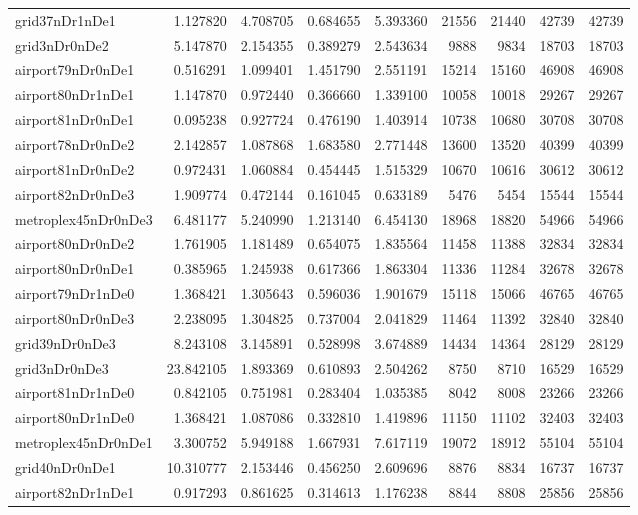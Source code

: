 \begin{longtable}{|l|r|r|r|r|r|r|r|r|}
grid37nDr1nDe1 & 1.127820 & 4.708705 & 0.684655 & 5.393360 & 21556 & 21440 & 42739 & 42739 \\
grid3nDr0nDe2 & 5.147870 & 2.154355 & 0.389279 & 2.543634 & 9888 & 9834 & 18703 & 18703 \\
airport79nDr0nDe1 & 0.516291 & 1.099401 & 1.451790 & 2.551191 & 15214 & 15160 & 46908 & 46908 \\
airport80nDr1nDe1 & 1.147870 & 0.972440 & 0.366660 & 1.339100 & 10058 & 10018 & 29267 & 29267 \\
airport81nDr0nDe1 & 0.095238 & 0.927724 & 0.476190 & 1.403914 & 10738 & 10680 & 30708 & 30708 \\
airport78nDr0nDe2 & 2.142857 & 1.087868 & 1.683580 & 2.771448 & 13600 & 13520 & 40399 & 40399 \\
airport81nDr0nDe2 & 0.972431 & 1.060884 & 0.454445 & 1.515329 & 10670 & 10616 & 30612 & 30612 \\
airport82nDr0nDe3 & 1.909774 & 0.472144 & 0.161045 & 0.633189 & 5476 & 5454 & 15544 & 15544 \\
metroplex45nDr0nDe3 & 6.481177 & 5.240990 & 1.213140 & 6.454130 & 18968 & 18820 & 54966 & 54966 \\
airport80nDr0nDe2 & 1.761905 & 1.181489 & 0.654075 & 1.835564 & 11458 & 11388 & 32834 & 32834 \\
airport80nDr0nDe1 & 0.385965 & 1.245938 & 0.617366 & 1.863304 & 11336 & 11284 & 32678 & 32678 \\
airport79nDr1nDe0 & 1.368421 & 1.305643 & 0.596036 & 1.901679 & 15118 & 15066 & 46765 & 46765 \\
airport80nDr0nDe3 & 2.238095 & 1.304825 & 0.737004 & 2.041829 & 11464 & 11392 & 32840 & 32840 \\
grid39nDr0nDe3 & 8.243108 & 3.145891 & 0.528998 & 3.674889 & 14434 & 14364 & 28129 & 28129 \\
grid3nDr0nDe3 & 23.842105 & 1.893369 & 0.610893 & 2.504262 & 8750 & 8710 & 16529 & 16529 \\
airport81nDr1nDe0 & 0.842105 & 0.751981 & 0.283404 & 1.035385 & 8042 & 8008 & 23266 & 23266 \\
airport80nDr1nDe0 & 1.368421 & 1.087086 & 0.332810 & 1.419896 & 11150 & 11102 & 32403 & 32403 \\
metroplex45nDr0nDe1 & 3.300752 & 5.949188 & 1.667931 & 7.617119 & 19072 & 18912 & 55104 & 55104 \\
grid40nDr0nDe1 & 10.310777 & 2.153446 & 0.456250 & 2.609696 & 8876 & 8834 & 16737 & 16737 \\
airport82nDr1nDe1 & 0.917293 & 0.861625 & 0.314613 & 1.176238 & 8844 & 8808 & 25856 & 25856 \\

\end{longtable}
